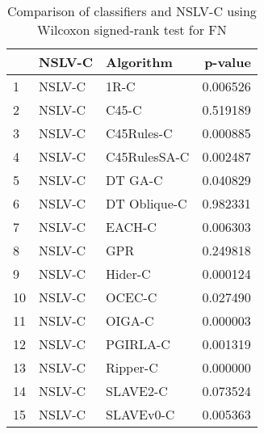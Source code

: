 \begin{table}
\footnotesize
\caption{Comparison of classifiers and NSLV-C using Wilcoxon signed-rank test for FN}
\label{tab:NSLV-C wilcoxon FN comparison}
\begin{tabular}{lllr}
\hline
 & NSLV-C & Algorithm & p-value \\
\hline
1 & NSLV-C & 1R-C & 0.006526 \\
2 & NSLV-C & C45-C & 0.519189 \\
3 & NSLV-C & C45Rules-C & 0.000885 \\
4 & NSLV-C & C45RulesSA-C & 0.002487 \\
5 & NSLV-C & DT GA-C & 0.040829 \\
6 & NSLV-C & DT Oblique-C & 0.982331 \\
7 & NSLV-C & EACH-C & 0.006303 \\
8 & NSLV-C & GPR & 0.249818 \\
9 & NSLV-C & Hider-C & 0.000124 \\
10 & NSLV-C & OCEC-C & 0.027490 \\
11 & NSLV-C & OIGA-C & 0.000003 \\
12 & NSLV-C & PGIRLA-C & 0.001319 \\
13 & NSLV-C & Ripper-C & 0.000000 \\
14 & NSLV-C & SLAVE2-C & 0.073524 \\
15 & NSLV-C & SLAVEv0-C & 0.005363 \\
\hline
\end{tabular}
\end{table}
